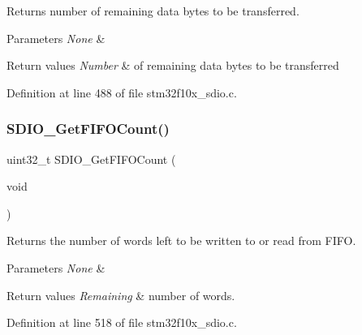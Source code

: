 Returns number of remaining data bytes to be transferred. 


\begin{DoxyParams}{Parameters}
{\em None} & \\
\hline
\end{DoxyParams}

\begin{DoxyRetVals}{Return values}
{\em Number} & of remaining data bytes to be transferred \\
\hline
\end{DoxyRetVals}


Definition at line 488 of file stm32f10x\+\_\+sdio.\+c.

\mbox{\label{group___s_d_i_o___exported___functions_ga9a3343983a2d68b5164a1c89797d2dd6}} 
\subsubsection{\texorpdfstring{S\+D\+I\+O\+\_\+\+Get\+F\+I\+F\+O\+Count()}{SDIO\_GetFIFOCount()}}
{\footnotesize\ttfamily uint32\+\_\+t S\+D\+I\+O\+\_\+\+Get\+F\+I\+F\+O\+Count (\begin{DoxyParamCaption}\item[{void}]{ }\end{DoxyParamCaption})}



Returns the number of words left to be written to or read from F\+I\+FO. 


\begin{DoxyParams}{Parameters}
{\em None} & \\
\hline
\end{DoxyParams}

\begin{DoxyRetVals}{Return values}
{\em Remaining} & number of words. \\
\hline
\end{DoxyRetVals}


Definition at line 518 of file stm32f10x\+\_\+sdio.\+c.

\mbox{\label{group___s_d_i_o___exported___functions_ga644514b4b3c95c5c4326d99cd166f6f9}} 
